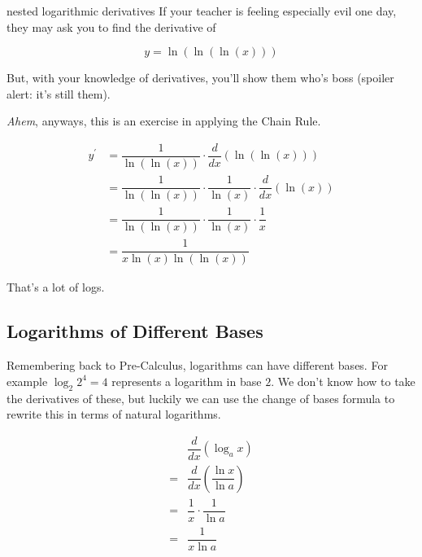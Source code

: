 \begin{example}{nested logarithmic derivatives}
    If your teacher is feeling especially evil one day, they may ask you to find the derivative of
    
    \[ y = \ln{\left( \ln{\left( \ln{\left( x\right)} \right)} \right)} \]
    
    But, with your knowledge of derivatives, you'll show them who's boss (spoiler alert: it's still them).
    
    \vspace{0.2cm}
    
    \textit{Ahem}, anyways, this is an exercise in applying the Chain Rule.
    
    \begin{align}
        y^\prime &= \dfrac{1}{\ln{\left( \ln{\left( x \right)}\right)}} \cdot \dfrac{d}{dx} \left( \ln{\left( \ln{\left( x \right)}\right)} \right) \\
        &= \dfrac{1}{\ln{\left( \ln{\left( x \right)}\right)}} \cdot \dfrac{1}{\ln{\left( x \right)}} \cdot \dfrac{d}{dx} \left( \ln{\left( x \right)} \right) \\
        &= \dfrac{1}{\ln{\left( \ln{\left( x \right)}\right)}} \cdot \dfrac{1}{\ln{\left( x \right)}} \cdot \dfrac{1}{x} \\
        &= \dfrac{1}{x \ln{\left( x \right)} \ln{\left( \ln{\left( x \right)} \right)}}
    \end{align}
    
    That's a lot of logs.
\end{example}

\subsection{Logarithms of Different Bases}

Remembering back to Pre-Calculus, logarithms can have different bases. For example \( \log_2{2^4} = 4 \) represents a logarithm in base \( 2 \). We don't know how to take the derivatives of these, but luckily we can use the change of bases formula to rewrite this in terms of natural logarithms.

\begin{align}
    &\dfrac{d}{dx} \left( \log_a{x} \right) \\
    = &\dfrac{d}{dx} \left( \dfrac{\ln{x}}{\ln{a}} \right) \\
    = &\dfrac{1}{x} \cdot \dfrac{1}{\ln{a}} \\
    = &\dfrac{1}{x \ln{a}}
\end{align}

